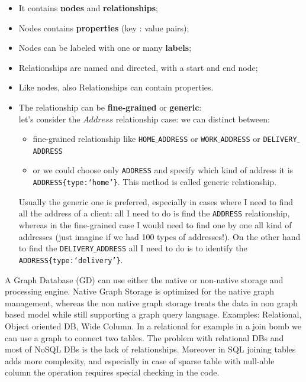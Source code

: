 \documentclass[a4page, 11pt]{article}
\begin{document}
\begin{itemize}[noitemsep]
	 
	\item
	It contains \textbf{nodes} and \textbf{relationships};
	\item
	Nodes contains \textbf{properties} (key : value pairs);
	\item
	Nodes can be labeled with one or many \textbf{labels};
	\item
	Relationships are named and directed, with a start and end node;
	\item
	Like nodes, also Relationships can contain properties.
	\item
	The relationship can be \textbf{fine-grained} or \textbf{generic}: \\let's consider the $Address$ relationship case: we can distinct between:
	\begin{itemize}
		
		 \item fine-grained relationship like \texttt{HOME$\_$ADDRESS} or \texttt{WORK$\_$ADDRESS} or \texttt{DELIVERY$\_$ADDRESS} 
		 \item or we could choose only \texttt{ADDRESS} and specify which kind of address it is \texttt{ADDRESS\{type:`home'\}}. This method is called generic relationship. 
	\end{itemize}		 
	Usually the generic one is preferred,  especially in cases where I need to find all the address of a client: all I need to do is find the \texttt{ADDRESS} relationship, whereas in the fine-grained case I would need to find one by one all kind of addresses (just	imagine if we had 100 types of addresses!). On the other hand to find the \texttt{DELIVERY$\_$ADDRESS} all I need to do is to identify the \texttt{ADDRESS\{type:`delivery'\}}. 

\end{itemize}
A Graph Database (GD) can use either the native or non-native storage and processing engine.
\newline
Native Graph Storage is optimized for the native graph management, whereas the non native graph storage treats the data in non graph based model while still supporting a graph query language. Examples: Relational, Object oriented DB, Wide Column. 
In a relational for example in a join bomb we can use a graph to connect two tables. 
The problem with relational DBs and most of NoSQL DBs is the lack of relationships.
Moreover in SQL joining tables adds more complexity, and especially in case of sparse table with null-able column the operation requires special checking in the code.
\end{document}
